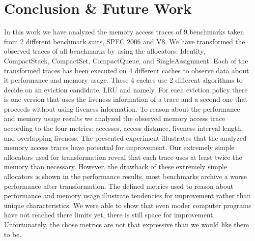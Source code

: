 \documentclass[onecolumn, openright, master, english, signatures]{dbrgrptt}
\begin{document}



\chapter{Conclusion \& Future Work}\label{cha:conclusion}

In this work we have analyzed the memory access traces of 9 benchmarks taken from 2 different benchmark suits, SPEC 2006 and V8.
We have transformed the observed traces of all benchmarks by using the allocators: Identity, CompactStack, CompactSet, CompactQueue, and SingleAssignment.
Each of the transformed traces has been executed on 4 different caches to observe data about it performance and memory usage.
These 4 caches use 2 different algorithms to decide on an eviction candidate, \ac{LRU} and \citeauthor{belady1966study} namely.
For each eviction policy there is one version that uses the liveness information of a trace and a second one that proceeds without using liveness information.
To reason about the performance and memory usage results we analyzed the observed memory access trace according to the four metrics: accesses, access distance, liveness interval length, and overlapping liveness.
The presented experiment illustrates that the analyzed memory access traces have potential for improvement.
Our extremely simple allocators used for transformation reveal that each \ac{trace} uses at least twice the memory than necessary.
However, the drawback of these extremely simple allocators is shown in the performance results, most benchmarks archive a worse performance after transformation.
The defined metrics used to reason about performance and memory usage illustrate tendencies for improvement rather than unique characteristics.
We were able to show that even moder computer programs have not reached there limits yet, there is still space for improvement.
Unfortunately, the chose metrics are not that expressive than we would like them to be.
\end{document}
